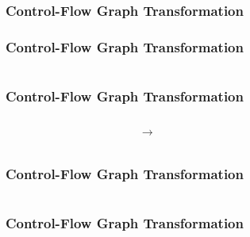 \begin{frame}[t]
	\frametitle{Control-Flow Graph Transformation}
	\resizebox{\textwidth}{!}{}
\end{frame}

\begin{frame}[t]
	\frametitle{Control-Flow Graph Transformation}
	\begin{columns}
		\begin{column}{0.4\textwidth}
			\resizebox{0.75\textwidth}{!}{}
		\end{column}
		\begin{column}{0.4\textwidth}
			\onslide<3->
			\resizebox{0.6\textwidth}{!}{}
		\end{column}
	\end{columns}
\end{frame}

\begin{frame}[t]
	\frametitle{Control-Flow Graph Transformation}
	\begin{center}
		\begin{columns}[c]
			\begin{column}{0.4\textwidth}
				\resizebox{0.6\textwidth}{!}{}
			\end{column}
			\begin{column}{0.03\textwidth}
				$\rightarrow$
			\end{column}
			\begin{column}{0.4\textwidth}
					\resizebox{\textwidth}{!}{}
			\end{column}
		\end{columns}
		\end{center}
\end{frame}

\begin{frame}[t]
	\frametitle{Control-Flow Graph Transformation}
	\begin{columns}
		\begin{column}{0.4\textwidth}
			\resizebox{0.75\textwidth}{!}{}
		\end{column}
			\begin{column}{0.4\textwidth}
				\resizebox{\textwidth}{!}{}
			\end{column}
	\end{columns}
\end{frame}

\begin{frame}[t]
	\frametitle{Control-Flow Graph Transformation}
	\begin{columns}
		\begin{column}{0.4\textwidth}
			\resizebox{0.75\textwidth}{!}{}
		\end{column}
		\begin{column}{0.4\textwidth}
			\resizebox{0.8\textwidth}{!}{}
		\end{column}
	\end{columns}
\end{frame}
